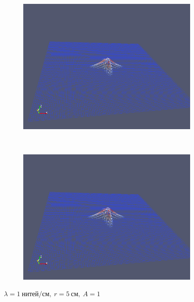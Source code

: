\begin{figure}[H]
\begin{subfigure}[t]{0.5\textwidth}
        \includegraphics[width=\textwidth]{img/fiber/density_1_radius_5_amplitude_1/5.png}
    \end{subfigure}%
    ~
    \begin{subfigure}[t]{0.5\textwidth}
        \centering
        \includegraphics[width=\textwidth]{img/fiber/density_1_radius_5_amplitude_1/6.png}
    \end{subfigure}
    \caption{$\lambda=1~нитей/см,~r=5~см,~A=1$}
\end{figure}

